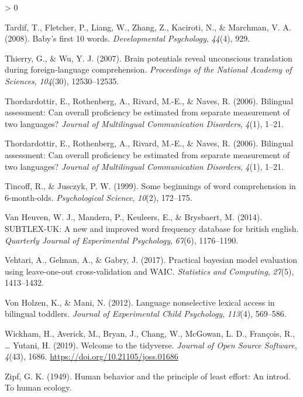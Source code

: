 \documentclass[
  english,
  man,man,floatsintext]{apa6}
\newlength{\cslhangindent}
\newenvironment{CSLReferences}[2] %
 {%
  \setlength{\parindent}{0pt}
  \ifodd #1 \everypar{\setlength{\hangindent}{\cslhangindent}}\ignorespaces\fi
  \ifnum #2 > 0
  \setlength{\parskip}{#2\baselineskip}
  \fi
 }%
 {}
\begin{document}
\begin{CSLReferences}{1}{0}
\leavevmode\hypertarget{ref-tardif2008baby}{}%
Tardif, T., Fletcher, P., Liang, W., Zhang, Z., Kaciroti, N., \& Marchman, V. A. (2008). Baby's first 10 words. \emph{Developmental Psychology}, \emph{44}(4), 929.

\leavevmode\hypertarget{ref-thierry2007brain}{}%
Thierry, G., \& Wu, Y. J. (2007). Brain potentials reveal unconscious translation during foreign-language comprehension. \emph{Proceedings of the National Academy of Sciences}, \emph{104}(30), 12530--12535.

\leavevmode\hypertarget{ref-thordardottir2006bilingual}{}%
Thordardottir, E., Rothenberg, A., Rivard, M.-E., \& Naves, R. (2006). Bilingual assessment: Can overall proficiency be estimated from separate measurement of two languages? \emph{Journal of Multilingual Communication Disorders}, \emph{4}(1), 1--21.

\leavevmode\hypertarget{ref-thordardottir2006bilingual}{}%
Thordardottir, E., Rothenberg, A., Rivard, M.-E., \& Naves, R. (2006). Bilingual assessment: Can overall proficiency be estimated from separate measurement of two languages? \emph{Journal of Multilingual Communication Disorders}, \emph{4}(1), 1--21.

\leavevmode\hypertarget{ref-tincoff1999some}{}%
Tincoff, R., \& Jusczyk, P. W. (1999). Some beginnings of word comprehension in 6-month-olds. \emph{Psychological Science}, \emph{10}(2), 172--175.

\leavevmode\hypertarget{ref-van2014subtlex}{}%
Van Heuven, W. J., Mandera, P., Keuleers, E., \& Brysbaert, M. (2014). SUBTLEX-UK: A new and improved word frequency database for british english. \emph{Quarterly Journal of Experimental Psychology}, \emph{67}(6), 1176--1190.

\leavevmode\hypertarget{ref-vehtari2017practical}{}%
Vehtari, A., Gelman, A., \& Gabry, J. (2017). Practical bayesian model evaluation using leave-one-out cross-validation and WAIC. \emph{Statistics and Computing}, \emph{27}(5), 1413--1432.

\leavevmode\hypertarget{ref-von2012language}{}%
Von Holzen, K., \& Mani, N. (2012). Language nonselective lexical access in bilingual toddlers. \emph{Journal of Experimental Child Psychology}, \emph{113}(4), 569--586.

\leavevmode\hypertarget{ref-R-tidyverse}{}%
Wickham, H., Averick, M., Bryan, J., Chang, W., McGowan, L. D., François, R., \ldots{} Yutani, H. (2019). Welcome to the {tidyverse}. \emph{Journal of Open Source Software}, \emph{4}(43), 1686. \url{https://doi.org/10.21105/joss.01686}

\leavevmode\hypertarget{ref-zipf1949human}{}%
Zipf, G. K. (1949). Human behavior and the principle of least effort: An introd. To human ecology.

\end{CSLReferences}

\endgroup
\end{document}
